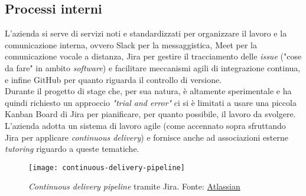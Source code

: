 \subsection{Processi interni}
L'azienda si serve di servizi noti e standardizzati per organizzare il lavoro e la comunicazione interna, ovvero Slack per la messaggistica, Meet per la comunicazione vocale a distanza, Jira per gestire il tracciamento delle \textit{issue} ("cose da fare" in ambito \textit{software}) e facilitare meccanismi agili di integrazione continua, e infine GitHub per quanto riguarda il controllo di versione.\\
Durante il progetto di stage che, per sua natura, è altamente sperimentale e ha quindi richiesto un approccio \textit{"trial and error"} ci si è limitati a usare una piccola Kanban Board di Jira per pianificare, per quanto possibile, il lavoro da svolgere.\\
L'azienda adotta un sistema di lavoro agile (come accennato sopra sfruttando Jira per applicare \textit{continuous delivery}) e fornisce anche ad associazioni esterne \textit{tutoring} riguardo a queste tematiche. \\
\begin{figure}[ht]
    \centering
    \texttt{[image: continuous-delivery-pipeline]}
    \caption{\textit{Continuous delivery pipeline} tramite Jira. Fonte: \href{https://www.atlassian.com/continuous-delivery}{Atlassian}}
\end{figure}\aCapo{}


